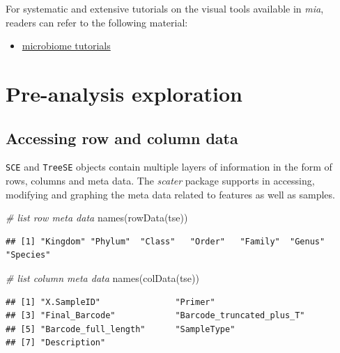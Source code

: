 \documentclass[
]{book}
\newenvironment{Shaded}{\begin{snugshade}}{\end{snugshade}}
\newcommand{\CommentTok}[1]{\textcolor[rgb]{0.56,0.35,0.01}{\textit{#1}}}
\newcommand{\FunctionTok}[1]{\textcolor[rgb]{0.00,0.00,0.00}{#1}}
\newcommand{\NormalTok}[1]{#1}
\providecommand{\tightlist}{%
  \setlength{\itemsep}{0pt}\setlength{\parskip}{0pt}}
\begin{document}
For systematic and extensive tutorials on the visual tools available
in \emph{mia}, readers can refer to the following material:

\begin{itemize}
\tightlist
\item
  \href{https://microbiome.github.io/tutorials/}{microbiome tutorials}
\end{itemize}

\hypertarget{pre-analysis-exploration}{%
\section{Pre-analysis exploration}\label{pre-analysis-exploration}}

\hypertarget{accessing-row-and-column-data}{%
\subsection{Accessing row and column data}\label{accessing-row-and-column-data}}

\texttt{SCE} and \texttt{TreeSE} objects contain multiple layers of information in the
form of rows, columns and meta data. The \emph{scater} package supports in
accessing, modifying and graphing the meta data related to features as
well as samples.

\begin{Shaded}
\begin{Highlighting}[]
\CommentTok{\# list row meta data}
\FunctionTok{names}\NormalTok{(}\FunctionTok{rowData}\NormalTok{(tse))}
\end{Highlighting}
\end{Shaded}

\begin{verbatim}
## [1] "Kingdom" "Phylum"  "Class"   "Order"   "Family"  "Genus"   "Species"
\end{verbatim}

\begin{Shaded}
\begin{Highlighting}[]
\CommentTok{\# list column meta data}
\FunctionTok{names}\NormalTok{(}\FunctionTok{colData}\NormalTok{(tse))}
\end{Highlighting}
\end{Shaded}

\begin{verbatim}
## [1] "X.SampleID"               "Primer"                  
## [3] "Final_Barcode"            "Barcode_truncated_plus_T"
## [5] "Barcode_full_length"      "SampleType"              
## [7] "Description"
\end{verbatim}
\end{document}
